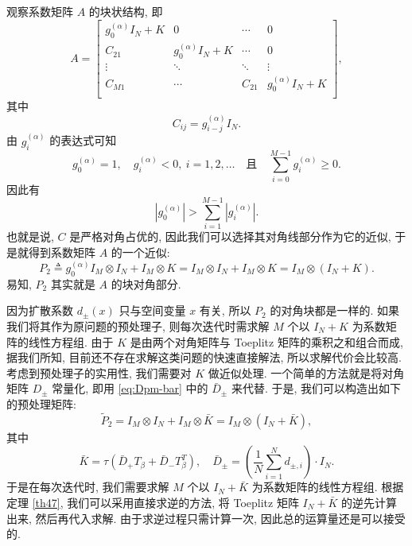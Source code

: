 \documentclass{ecnumaster}
\newcommand{\beq}{\begin{equation}}
\newcommand{\eeq}{\end{equation}}
\begin{document}
观察系数矩阵 $A$ 的块状结构, 即
$$
  A =
    \begin{bmatrix}
      g_0^{(\alpha)} I_N + K & 0 & \cdots & 0\\
      C_{21} & g_0^{(\alpha)} I_N + K & \cdots & 0\\
      \vdots & \ddots & \ddots & \vdots \\
      C_{M1} & \cdots & C_{21} & g_0^{(\alpha)} I_N + K \\
    \end{bmatrix},
$$
其中
$$
  C_{ij} = g_{i-j}^{(\alpha)} I_N.
$$
由 $g_{i}^{(\alpha)}$ 的表达式可知 \cite{MT04}
\beq\label{eq:g-alpha}
  g_0^{(\alpha)} = 1,\quad
  g_i^{(\alpha)} < 0,\ i=1,2,\ldots
  \quad\text{且}\quad
  \sum_{i=0}^{M-1} g_{i}^{(\alpha)} \ge 0.
\eeq
因此有
\begin{equation}
  |g_0^{(\alpha)}| > \sum _{i=1}^{M-1} |g_i^{(\alpha)}|.
\end{equation}
也就是说, $C$ 是严格对角占优的, 因此我们可以选择其对角线部分作为它的近似,
于是就得到系数矩阵 $A$ 的一个近似:
$$
 P_2\triangleq g_0^{(\alpha)} I_M \otimes I_N + I_M \otimes K
 = I_M \otimes I_N + I_M \otimes K
 = I_M \otimes (I_N + K).
$$
易知, $P_2$ 其实就是 $A$ 的块对角部分.

因为扩散系数 $d_\pm(x)$ 只与空间变量 $x$ 有关,
所以 $P_2$ 的对角块都是一样的.
如果我们将其作为原问题的预处理子, 则每次迭代时需求解 $M$
个以 $I_N+K$ 为系数矩阵的线性方程组.
由于 $K$ 是由两个对角矩阵与 Toeplitz 矩阵的乘积之和组合而成,
据我们所知, 目前还不存在求解这类问题的快速直接解法,
所以求解代价会比较高.
考虑到预处理子的实用性, 我们需要对 $K$ 做近似处理.
一个简单的方法就是将对角矩阵 $D_{\pm}$ 常量化,
即用 \eqref{eq:Dpm-bar} 中的  $\bar{D}_{\pm}$ 来代替.
于是, 我们可以构造出如下的预处理矩阵:
\begin{equation}
  \tilde{P}_2 = I_M \otimes I_N + I_M \otimes \bar{K}
      = I_M \otimes (I_N + \bar{K}),
\end{equation}
其中
\beq\label{eq:k-bar}
    \bar{K} = \tau (\bar{D}_+ T_{\beta} + \bar{D}_- T_{\beta}^T),
    \quad
    \bar{D}_{\pm} = \left(\frac{1}{N} \sum_{i=1}^{N} d_{\pm, i}\right) \cdot I_N.
\eeq
于是在每次迭代时, 我们需要求解 $M$ 个以 $I_N+\bar{K}$ 为系数矩阵的线性方程组.
根据定理 \ref{th47}, 我们可以采用直接求逆的方法,
将 Toeplitz 矩阵 $I_N+\bar{K}$ 的逆先计算出来, 然后再代入求解.
由于求逆过程只需计算一次, 因此总的运算量还是可以接受的.
\end{document}
